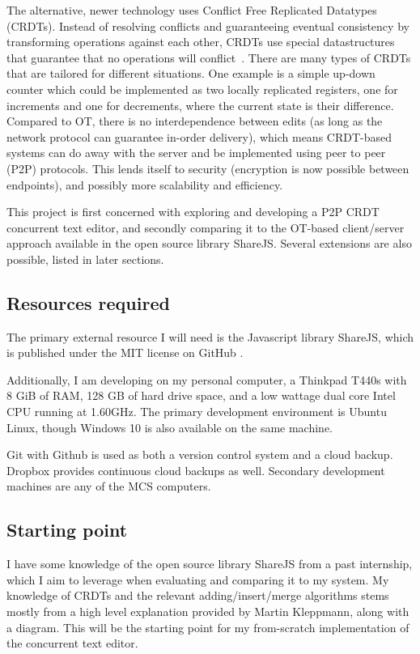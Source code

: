 \documentclass[12pt,a4paper,twoside]{article}
\begin{document}
The alternative, newer technology uses Conflict Free Replicated Datatypes (CRDTs). Instead of resolving conflicts and guaranteeing eventual consistency by transforming operations against each other, CRDTs use special datastructures that guarantee that no operations will conflict~\cite{preguica2009}. There are many types of CRDTs that are tailored for different situations. One example is a simple up-down counter which could be implemented as two locally replicated registers, one for increments and one for decrements, where the current state is their difference\cite{shapiro2011}. Compared to OT, there is no interdependence between edits (as long as the network protocol can guarantee in-order delivery), which means CRDT-based systems can do away with the server and be implemented using peer to peer (P2P) protocols. This lends itself to security (encryption is now possible between endpoints),
and possibly more scalability and efficiency.

This project is first concerned with exploring and developing a P2P CRDT concurrent text editor, and secondly comparing it to the OT-based client/server approach available in the open source library ShareJS. Several extensions are also possible,
listed in later sections.

\subsection*{Resources required}

The primary external resource I will need is the Javascript library ShareJS, which is published under the MIT license on GitHub \cite{sharejs}.

Additionally, I am developing on my personal computer, a Thinkpad T440s with 8 GiB of RAM,
128 GB of hard drive space, and a low wattage dual core Intel CPU running at 1.60GHz.
The primary development environment is Ubuntu Linux, though Windows 10 is also available 
on the same machine. 

Git with Github is used as both a version control system and a cloud backup. Dropbox  
provides continuous cloud backups as well. Secondary development machines are any of the MCS computers.

\subsection*{Starting point}

I have some knowledge of the open source library ShareJS from a past internship, which I aim to leverage when 
evaluating and comparing it to my system. My knowledge of CRDTs and the relevant adding/insert/merge
algorithms stems mostly from a high level explanation provided by Martin Kleppmann, along with a diagram.
This will be the starting point for my from-scratch implementation of the concurrent text editor.
\end{document}
